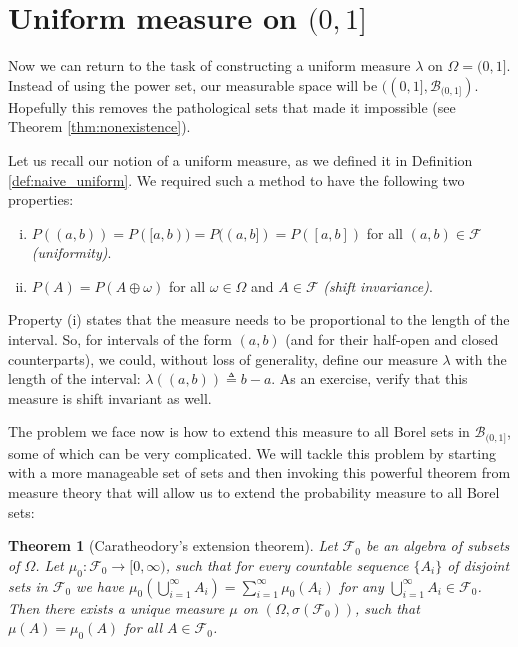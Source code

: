 \documentclass{book}
\theoremstyle{plain}%
\newtheorem{theorem}{Theorem}[section]
\theoremstyle{definition}
\newlength{\arrow}
\begin{document}
\section{Uniform measure on $(0, 1]$}

Now we can return to the task of constructing a uniform measure $\lambda$ on $\Omega = (0,1]$. Instead of using the power set, our measurable space will be $((0,1], \mathcal{B}_{(0,1]})$. Hopefully this removes the pathological sets that made it impossible (see Theorem \ref{thm:nonexistence}).

Let us recall our notion of a uniform measure, as we defined it in Definition \ref{def:naive_uniform}. We required such a method to have the following two properties:
  
\begin{enumerate}[(i)]
\item $P((a,b)) = P([a,b)) = P((a,b]) = P([a,b])$ for all $(a,b) \in \mathcal{F}$ \emph{(uniformity)}.
\item $P(A) = P(A \oplus \omega)$ for all $\omega \in \Omega$ and $A \in \mathcal{F}$ \emph{(shift invariance)}.
\end{enumerate}

Property (i) states that the measure needs to be proportional to the length of the interval. So, for intervals of the form $(a,b)$ (and for their half-open and closed counterparts), we could, without loss of generality, define our measure $\lambda$ with the length of the interval: $\lambda((a,b)) \triangleq b - a$. As an exercise, verify that this measure is shift invariant as well. 

The problem we face now is how to extend this measure to all Borel sets in $\mathcal{B}_{(0,1]}$, some of which can be very complicated. We will tackle this problem by starting with a more manageable set of sets and then invoking this powerful theorem from measure theory that will allow us to extend the probability measure to all Borel sets:

\begin{theorem}[Caratheodory's extension theorem]
Let $\mathcal{F}_0$ be an algebra of subsets of $\Omega$. Let $\mu_0: \mathcal{F}_0 \rightarrow [0,\infty)$, such that for every countable sequence $\{A_i\}$ of disjoint sets in $\mathcal{F}_0$ we have $\mu_0(\bigcup_{i=1}^\infty A_i) = \sum_{i=1}^\infty \mu_0(A_i)$ for any $\bigcup_{i=1}^\infty A_i \in \mathcal{F}_0$. Then there exists a unique measure $\mu$ on $(\Omega, \sigma( \mathcal{F}_0 ))$, such that $\mu(A) = \mu_0(A)$ for all $A \in \mathcal{F}_0$.
\label{thm:caratheodory}
\end{theorem}
\end{document}
